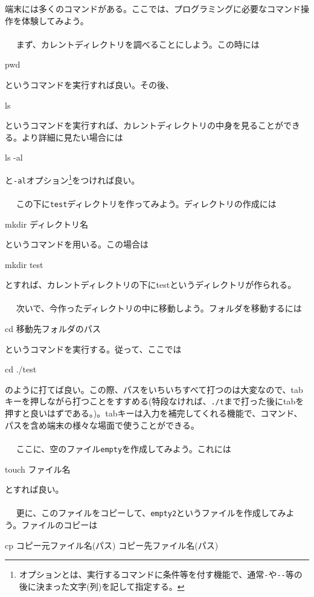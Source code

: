 端末には多くのコマンドがある。ここでは、プログラミングに必要なコマンド操作を体験してみよう。
\\ \\　
まず、カレントディレクトリを調べることにしよう。この時には
\begin{code}
pwd
\end{code}
というコマンドを実行すれば良い。その後、
\begin{code}
ls
\end{code}
というコマンドを実行すれば、カレントディレクトリの中身を見ることができる。より詳細に見たい場合には
\begin{code}
ls -al
\end{code}
と\verb|-al|オプション\footnote{オプションとは、実行するコマンドに条件等を付す機能で、通常\verb|-|や\verb|--|等の後に決まった文字(列)を記して指定する。}をつければ良い。
\\ \\　
この下に\verb|test|ディレクトリを作ってみよう。ディレクトリの作成には
\begin{code}
mkdir ディレクトリ名
\end{code}
というコマンドを用いる。この場合は
\begin{code}
mkdir test
\end{code}
とすれば、カレントディレクトリの下にtestというディレクトリが作られる。
\\ \\　
次いで、今作ったディレクトリの中に移動しよう。フォルダを移動するには
\begin{code}
cd 移動先フォルダのパス
\end{code}
というコマンドを実行する。従って、ここでは
\begin{code}
cd ./test
\end{code}
のように打てば良い。この際、パスをいちいちすべて打つのは大変なので、tabキーを押しながら打つことをすすめる(特段なければ、\verb|./t|まで打った後にtabを押すと良いはずである。)。tabキーは入力を補完してくれる機能で、コマンド、パスを含め端末の様々な場面で使うことができる。
\\ \\　
ここに、空のファイル\verb|empty|を作成してみよう。これには
\begin{code}
touch ファイル名
\end{code}
とすれば良い。
\\ \\　
更に、このファイルをコピーして、\verb|empty2|というファイルを作成してみよう。ファイルのコピーは
\begin{code}
cp コピー元ファイル名(パス) コピー先ファイル名(パス)
\end{code}
